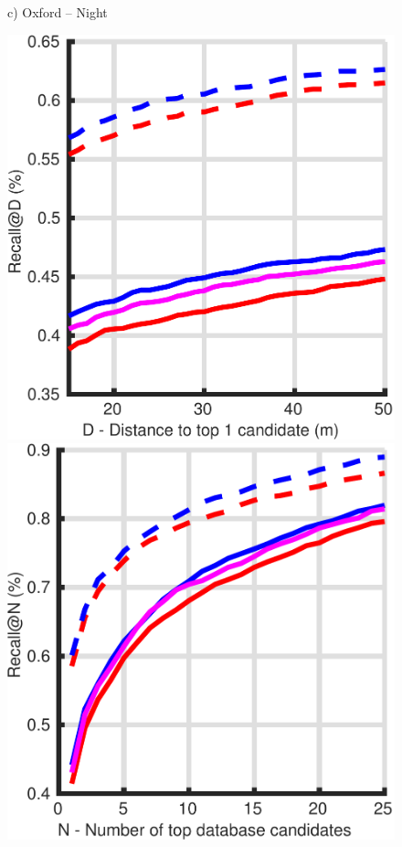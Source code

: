 \begin{figure}
\begin{minipage}{0.27\linewidth}
		c) Oxford -- Night
	\end{minipage}
	
	\vspace{5pt}	

	\begin{minipage}{0.27\linewidth}
		\center \scriptsize
		\includegraphics[width=\linewidth]{plot/oxf_cmu/Results_cmu_lt/distance}	
		
		\includegraphics[width=\linewidth]{plot/oxf_cmu/Results_cmu_lt/recall}
		

\end{minipage}
\end{figure}
